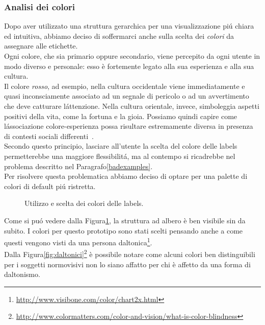 \documentclass[12pt]{article} %
\begin{document}
\subsubsection{Analisi dei colori}
Dopo aver utilizzato una struttura gerarchica per una visualizzazione pi\'u chiara ed intuitiva, abbiamo deciso di soffermarci anche sulla scelta dei \emph{colori} da assegnare alle etichette.\\
Ogni colore, che sia primario oppure secondario, viene percepito da ogni utente in modo diverso e personale: esso \`e fortemente legato alla sua esperienza e alla sua cultura.\\
Il colore \emph{rosso}, ad esempio, nella cultura occidentale viene immediatamente e quasi inconsciamente associato ad un segnale di pericolo o ad un avvertimento che deve catturare l\'attenzione. Nella cultura orientale, invece, simboleggia aspetti positivi della vita, come la fortuna e la gioia. Possiamo quindi capire come l\'associazione colore-esperienza possa risultare estremamente diversa in presenza di contesti sociali differenti~\cite[p.~9-12]{thesis}.\\
Secondo questo principio, lasciare all'utente la scelta del colore delle labels permetterebbe una maggiore flessibilit\'a, ma al contempo si ricadrebbe nel problema descritto nel Paragrafo\ref{badexamples}.\\
Per risolvere questa problematica abbiamo deciso di optare per una palette di colori di default pi\'u ristretta.

\begin{figure}[H]
\caption{Utilizzo e scelta dei colori delle labels.}
\label{fig:finale}
\end{figure}

Come si pu\'o vedere dalla Figura\ref{fig:finale}, la struttura ad albero \`e ben visibile sin da subito. I colori per questo prototipo sono stati scelti pensando anche a come questi vengono visti da una persona daltonica\footnote{\url{http://www.visibone.com/color/chart2x.html}}.\\
Dalla Figura\ref{fig:daltonici}\footnote{\url{http://www.colormatters.com/color-and-vision/what-is-color-blindness}} \`e possibile notare come alcuni colori ben distinguibili per i soggetti normovisivi non lo siano affatto per chi \`e affetto da una forma di daltonismo.
\end{document}
